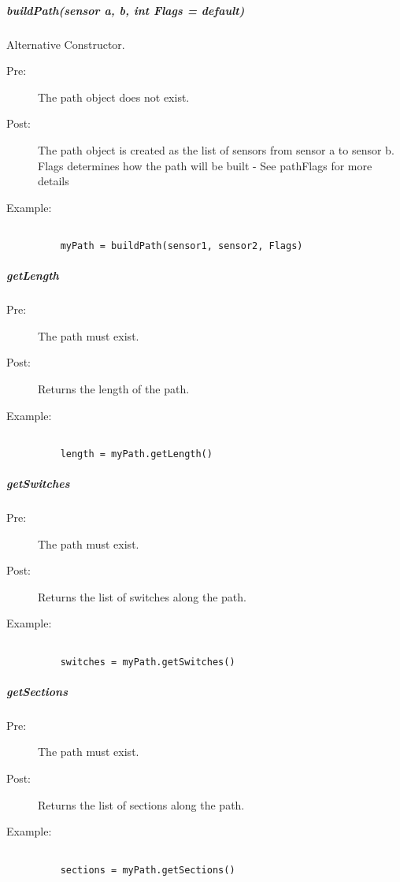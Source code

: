 \documentclass[a4paper,11pt,notitlepage]{article}
\begin{document}
\subparagraph{buildPath(sensor a, b, int Flags = default)} Alternative Constructor.
\begin{description}
\item[\hspace{1cm}Pre:] The path object does not exist.
\item[\hspace{1cm}Post:] The path object is created as the list of sensors from sensor a to sensor b. Flags determines how the path will be built - See pathFlags for more details 
\item[\hspace{1cm}Example:]
\begin{verbatim}

    myPath = buildPath(sensor1, sensor2, Flags)
\end{verbatim}
\end{description}

\subparagraph{getLength}
\begin{description}
\item[\hspace{1cm}Pre:] The path must exist.
\item[\hspace{1cm}Post:] Returns the length of the path.
\item[\hspace{1cm}Example:]
\begin{verbatim}

    length = myPath.getLength()
\end{verbatim}
\end{description}

\subparagraph{getSwitches}
\begin{description}
\item[\hspace{1cm}Pre:] The path must exist.
\item[\hspace{1cm}Post:] Returns the list of switches along the path.
\item[\hspace{1cm}Example:]
\begin{verbatim}

    switches = myPath.getSwitches()
\end{verbatim}
\end{description}

\subparagraph{getSections}
\begin{description}
\item[\hspace{1cm}Pre:] The path must exist.
\item[\hspace{1cm}Post:] Returns the list of sections along the path.
\item[\hspace{1cm}Example:]
\begin{verbatim}

    sections = myPath.getSections()
\end{verbatim}
\end{description}
\end{document}
